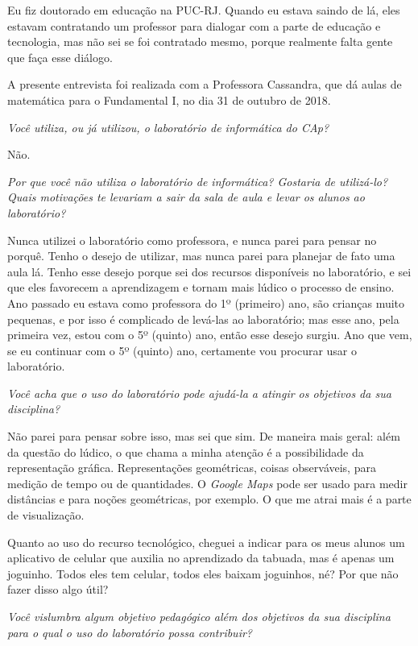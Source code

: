 Eu fiz doutorado em educação na PUC-RJ. Quando eu estava saindo de lá, eles estavam contratando um professor para dialogar com a parte de educação e tecnologia, mas não sei se foi contratado mesmo, porque realmente falta gente que faça esse diálogo.

\label{anx:LABEL_ANX_C}

A presente entrevista foi realizada com a Professora Cassandra, que dá aulas de matemática para o Fundamental I, no dia 31 de outubro de 2018.

\textit{Você utiliza, ou já utilizou, o laboratório de informática do CAp?}

Não.

\textit{Por que você não utiliza o laboratório de informática? Gostaria de utilizá-lo? Quais motivações te levariam a sair da sala de aula e levar os alunos ao laboratório?}

Nunca utilizei o laboratório como professora, e nunca parei para pensar no porquê. Tenho o desejo de utilizar, mas nunca parei para planejar de fato uma aula lá. Tenho esse desejo porque sei dos recursos disponíveis no laboratório, e sei que eles favorecem a aprendizagem e tornam mais lúdico o processo de ensino. Ano passado eu estava como professora do 1º (primeiro) ano, são crianças muito pequenas, e por isso é complicado de levá-las ao laboratório; mas esse ano, pela primeira vez, estou com o 5º (quinto) ano, então esse desejo surgiu. Ano que vem, se eu continuar com o 5º (quinto) ano, certamente vou procurar usar o laboratório.

\textit{Você acha que o uso do laboratório pode ajudá-la a atingir os objetivos da sua disciplina?}

Não parei para pensar sobre isso, mas sei que sim. De maneira mais geral: além da questão do lúdico, o que chama a minha atenção é a possibilidade da representação gráfica. Representações geométricas, coisas observáveis, para medição de tempo ou de quantidades. O \textit{Google Maps} pode ser usado para medir distâncias e para noções geométricas, por exemplo. O que me atrai mais é a parte de visualização.

Quanto ao uso do recurso tecnológico, cheguei a indicar para os meus alunos um aplicativo de celular que auxilia no aprendizado da tabuada, mas é apenas um joguinho. Todos eles tem celular, todos eles baixam joguinhos, né? Por que não fazer disso algo útil?

\textit{Você vislumbra algum objetivo pedagógico além dos objetivos da sua disciplina para o qual o uso do laboratório possa contribuir?}

